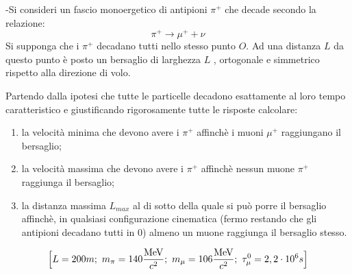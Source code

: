 \documentclass[12pt,twoside,a4]{article}
\begin{document}
\begin{esercizio}
	-Si consideri un fascio monoergetico di antipioni $\pi^+$ che decade secondo la relazione:
	\begin{equation*}
		\pi^+ \rightarrow \mu^+ + \nu
	\end{equation*}
Si supponga che i $\pi^+$ decadano tutti nello stesso punto $O$. Ad una distanza $L$ da questo punto è posto un bersaglio di larghezza $L$ , ortogonale e simmetrico rispetto alla direzione di volo.

Partendo dalla ipotesi che tutte le particelle decadono esattamente al loro tempo caratteristico e giustificando rigorosamente tutte le risposte calcolare:
\begin{enumerate}[label=(\textit{\roman*})]
	\item la velocità minima che devono avere i $\pi^+$ affinchè i muoni $\mu^+$ raggiungano il bersaglio;
	\item la velocità massima che devono avere i $\pi^+$ affinchè nessun muone $\pi^+$ raggiunga il bersaglio;
	\item la distanza massima $L_{max}$ al di sotto della quale si può porre il bersaglio affinchè, in qualsiasi configurazione cinematica (fermo restando che gli antipioni decadano tutti in $0$) almeno un muone raggiunga il bersaglio stesso.
\end{enumerate}
\begin{equation*}
	\Big[L=200m; \ m_\pi=140 \frac{\mathrm{MeV}}{c^2}; \ m_\mu = 106 \frac{\mathrm{MeV}}{c^2}; \ \tau_\mu^0 = 2,2 \cdot 10^6 s \Big] 
\end{equation*}
\end{esercizio}
\end{document}
